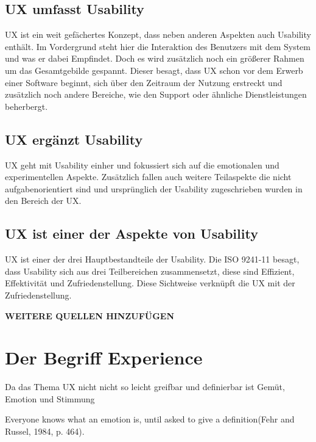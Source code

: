 \subsection{UX umfasst Usability} 
UX ist ein weit gefächertes Konzept, dass neben anderen Aspekten auch Usability enthält. Im Vordergrund steht hier die Interaktion des Benutzers mit dem System und was er dabei Empfindet. Doch es wird zusätzlich noch ein größerer Rahmen um das Gesamtgebilde gespannt. Dieser besagt, dass UX schon vor dem Erwerb einer Software beginnt, sich über den Zeitraum der Nutzung erstreckt und zusätzlich noch andere Bereiche, wie den Support oder ähnliche Dienstleistungen beherbergt.

\subsection{UX ergänzt Usability} 
UX geht mit Usability einher und fokussiert sich auf die emotionalen und experimentellen Aspekte. Zusätzlich fallen auch weitere Teilaspekte die nicht aufgabenorientiert sind und ursprünglich der Usability zugeschrieben wurden in den Bereich der UX.

\subsection{UX ist einer der Aspekte von Usability} 
UX ist einer der drei Hauptbestandteile der Usability. Die ISO 9241-11 besagt, dass Usability sich aus drei Teilbereichen zusammensetzt, diese sind Effizient, Effektivität und Zufriedenstellung. Diese Sichtweise verknüpft die UX mit der Zufriedenstellung. 

\cite{Garrett:2003wx}
\textbf{WEITERE QUELLEN HINZUFÜGEN}



\section{Der Begriff Experience}
Da das Thema UX nicht nicht so leicht greifbar und definierbar ist 
Gemüt, Emotion und Stimmung

\glqq Everyone knows what an emotion is, until asked to give a definition\grqq (Fehr and Russel, 1984, p. 464). \cite{Zimmermann:2006uv}



